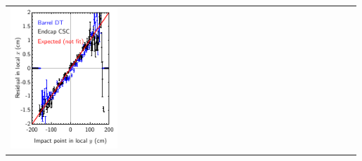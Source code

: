 \documentclass[compress]{beamer}
\begin{document}
\begin{frame}
\begin{center}
\begin{tabular}{p{0.33\linewidth} p{0.33\linewidth} p{0.33\linewidth}}
\begin{minipage}{\linewidth}
	\includegraphics[width=\linewidth]{phiz_xresid_vs_y}
      \end{minipage}
    \end{tabular}
  \end{center}
\end{frame}
\end{document}
